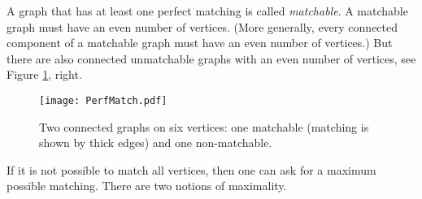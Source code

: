 

\setcounter{section}{4}
\setcounter{subsection}{1}
\setcounter{dfn}{1}


A graph that has at least one perfect matching is called \emph{matchable}.
A matchable graph must have an even number of vertices.
(More generally, every connected component of a matchable graph must have an even number of vertices.)
But there are also connected unmatchable graphs with an even number of vertices, see Figure \ref{fig:PerfMatch}, right.

\begin{figure}[ht]
\begin{center}
\texttt{[image: PerfMatch.pdf]}
\end{center}
\caption{Two connected graphs on six vertices: one matchable (matching is shown by thick edges) and one non-matchable.}
\label{fig:PerfMatch}
\end{figure}

If it is not possible to match all vertices, then one can ask for a maximum possible matching.
There are two notions of maximality.


